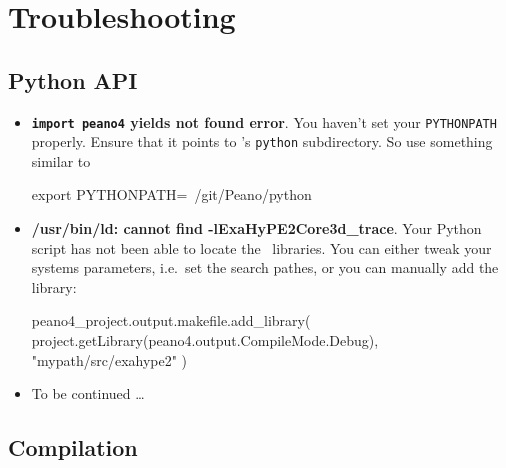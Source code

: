 \chapter{Troubleshooting}
\label{chapter:troubleshooting}

\section{Python API}

\begin{itemize}
  \item \textbf{\texttt{import peano4} yields not found error}. You haven't set
  your \texttt{PYTHONPATH} properly. Ensure that it points to \Peano's
  \texttt{python} subdirectory. So use something similar to 
  \begin{code}
export PYTHONPATH=~/git/Peano/python
  \end{code}
  \item \textbf{/usr/bin/ld: cannot find -lExaHyPE2Core3d\_trace}. Your Python
  script has not been able to locate the \Peano\ libraries. You can either tweak
  your systems parameters, i.e.~set the search pathes, or you can manually add
  the library:
\begin{code}
peano4_project.output.makefile.add_library(
  project.getLibrary(peano4.output.CompileMode.Debug), 
  "mypath/src/exahype2" 
)
\end{code}
  \item To be continued \dots
\end{itemize}


\section{Compilation}





